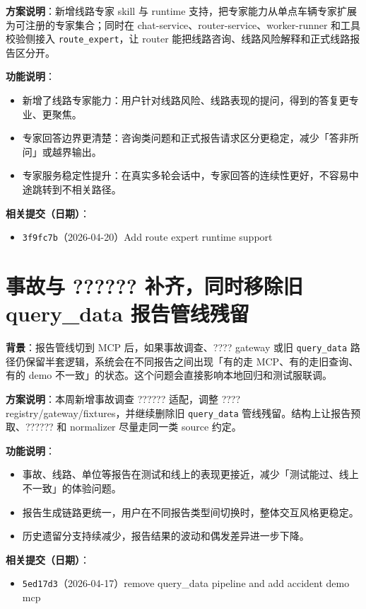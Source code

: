 \documentclass[UTF8]{ctexart}
\begin{document}
\textbf{方案说明}：新增线路专家 skill 与 runtime 支持，把专家能力从单点车辆专家扩展为可注册的专家集合；同时在 chat-service、router-service、worker-runner 和工具校验侧接入 \texttt{route\_expert}，让 router 能把线路咨询、线路风险解释和正式线路报告区分开。

\textbf{功能说明}：
\begin{itemize}
\item 新增了线路专家能力：用户针对线路风险、线路表现的提问，得到的答复更专业、更聚焦。
\item 专家回答边界更清楚：咨询类问题和正式报告请求区分更稳定，减少「答非所问」或越界输出。
\item 专家服务稳定性提升：在真实多轮会话中，专家回答的连续性更好，不容易中途跳转到不相关路径。
\end{itemize}

\textbf{相关提交（日期）}：
\begin{itemize}
\item \texttt{3f9fc7b}（2026-04-20）Add route expert runtime support
\end{itemize}

\section{事故与 ?????? 补齐，同时移除旧 query\_data 报告管线残留}

\textbf{背景}：报告管线切到 MCP 后，如果事故调查、???? gateway 或旧 \texttt{query\_data} 路径仍保留半套逻辑，系统会在不同报告之间出现「有的走 MCP、有的走旧查询、有的 demo 不一致」的状态。这个问题会直接影响本地回归和测试服联调。

\textbf{方案说明}：本周新增事故调查 ?????? 适配，调整 ???? registry/gateway/fixtures，并继续删除旧 \texttt{query\_data} 管线残留。结构上让报告预取、?????? 和 normalizer 尽量走同一类 source 约定。

\textbf{功能说明}：
\begin{itemize}
\item 事故、线路、单位等报告在测试和线上的表现更接近，减少「测试能过、线上不一致」的体验问题。
\item 报告生成链路更统一，用户在不同报告类型间切换时，整体交互风格更稳定。
\item 历史遗留分支持续减少，报告结果的波动和偶发差异进一步下降。
\end{itemize}

\textbf{相关提交（日期）}：
\begin{itemize}
\item \texttt{5ed17d3}（2026-04-17）remove query\_data pipeline and add accident demo mcp
\end{itemize}
\end{document}
